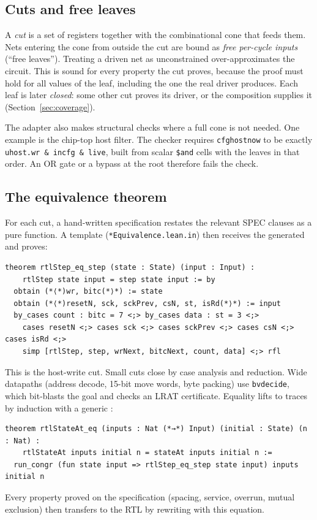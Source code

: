 \documentclass[11pt,a4paper]{article}
\newcommand{\brkus}{\textunderscore\allowbreak}
\newcommand{\code}[1]{{\let\_\brkus\texttt{#1}}}
\newcommand{\lean}[1]{\texttt{\detokenize{#1}}}
\begin{document}
\subsection{Cuts and free leaves}

A \emph{cut} is a set of registers together with the combinational cone that
feeds them. Nets entering the cone from outside the cut are bound as
\emph{free per-cycle inputs} (``free leaves''). Treating a driven net as
unconstrained over-approximates the circuit. This is sound for every property
the cut proves, because the proof must hold for all values of the leaf,
including the one the real driver produces. Each leaf is later
\emph{closed}: some other cut proves its driver, or the composition supplies
it (Section~\ref{sec:coverage}).

The adapter also makes structural checks where a full cone is not needed. One
example is the chip-top host filter. The checker requires
\code{cfg\_host\_now} to be exactly
\code{u\_host.wr \& in\_cfg \& live}, built from scalar \code{\$and} cells with
the leaves in that order. An OR gate or a bypass at the root therefore fails
the check.

\subsection{The equivalence theorem}

For each cut, a hand-written specification \lean{step} restates the relevant
SPEC clauses as a pure function. A template (\code{*Equivalence.lean.in}) then
receives the generated \lean{rtlStep} and proves:
\begin{lstlisting}
theorem rtlStep_eq_step (state : State) (input : Input) :
    rtlStep state input = step state input := by
  obtain (*⟨*)wr, bitc(*⟩*) := state
  obtain (*⟨*)resetN, sck, sckPrev, csN, st, isRd(*⟩*) := input
  by_cases count : bitc = 7 <;> by_cases data : st = 3 <;>
    cases resetN <;> cases sck <;> cases sckPrev <;> cases csN <;> cases isRd <;>
    simp [rtlStep, step, wrNext, bitcNext, count, data] <;> rfl
\end{lstlisting}
This is the host-write cut. Small cuts close by case analysis and reduction.
Wide datapaths (address decode, 15-bit move words, byte packing) use
\code{bv\_decide}, which bit-blasts the goal and checks an LRAT certificate.
Equality lifts to traces by induction with a generic \lean{run_congr}:
\begin{lstlisting}
theorem rtlStateAt_eq (inputs : Nat (*→*) Input) (initial : State) (n : Nat) :
    rtlStateAt inputs initial n = stateAt inputs initial n :=
  run_congr (fun state input => rtlStep_eq_step state input) inputs initial n
\end{lstlisting}
Every property proved on the specification (spacing, service, overrun,
mutual exclusion) then transfers to the RTL by rewriting with this equation.
\end{document}
